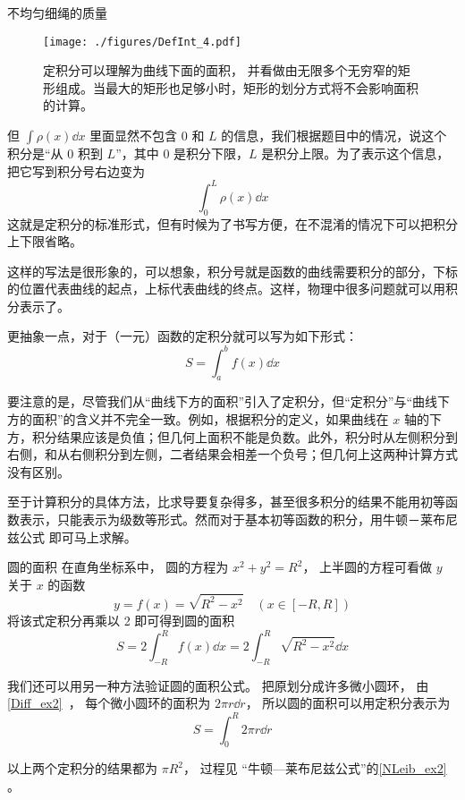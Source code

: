 \begin{example}{不均匀细绳的质量}
\begin{figure}[ht]
\centering
\texttt{[image: ./figures/DefInt\_4.pdf]}
\caption{定积分可以理解为曲线下面的面积， 并看做由无限多个无穷窄的矩形组成。当最大的矩形也足够小时，矩形的划分方式将不会影响面积的计算。} \label{DefInt_fig4}
\end{figure}

但 $\int \rho(x) \dd{x}$ 里面显然不包含 $0$ 和 $L$ 的信息，我们根据题目中的情况，说这个积分是“从 $0$ 积到 $L$”，其中 $0$ 是积分下限，$L$ 是积分上限。为了表示这个信息，把它写到积分号右边变为
\begin{equation}
\int_0^L \rho(x) \dd{x}
\end{equation}
这就是定积分的标准形式，但有时候为了书写方便，在不混淆的情况下可以把积分上下限省略。
\end{example}

这样的写法是很形象的，可以想象，积分号就是函数的曲线需要积分的部分，下标的位置代表曲线的起点，上标代表曲线的终点。这样，物理中很多问题就可以用积分表示了。

更抽象一点，对于（一元）函数的定积分就可以写为如下形式：
\begin{equation}
S=\int^b_a f(x) \dd x
\end{equation}

要注意的是，尽管我们从“曲线下方的面积”引入了定积分，但“定积分”与“曲线下方的面积”的含义并不完全一致。例如，根据积分的定义，如果曲线在 $x$ 轴的下方，积分结果应该是负值；但几何上面积不能是负数。此外，积分时从左侧积分到右侧，和从右侧积分到左侧，二者结果会相差一个负号；但几何上这两种计算方式没有区别。

至于计算积分的具体方法，比求导要复杂得多，甚至很多积分的结果不能用初等函数表示，只能表示为级数等形式。然而对于基本初等函数的积分，用牛顿－莱布尼兹公式 即可马上求解。

\begin{example}{圆的面积}\label{DefInt_ex2}
在直角坐标系中， 圆的方程为 $x^2 + y^2 = R^2$， 上半圆的方程可看做 $y$ 关于 $x$ 的函数
\begin{equation}
y = f(x) = \sqrt{R^2 - x^2} \quad (x\in [-R,R])
\end{equation}
将该式定积分再乘以 2 即可得到圆的面积
\begin{equation}
S = 2\int_{-R}^{R} f(x) \dd{x} = 2\int_{-R}^{R} \sqrt{R^2 - x^2} \dd{x}
\end{equation}

我们还可以用另一种方法验证圆的面积公式。 把原划分成许多微小圆环， 由\autoref{Diff_ex2}~， 每个微小圆环的面积为 $2\pi r\dd{r}$， 所以圆的面积可以用定积分表示为
\begin{equation}
S = \int_0^{R} 2\pi r\dd{r}
\end{equation}

以上两个定积分的结果都为 $\pi R^2$， 过程见 “牛顿—莱布尼兹公式”的\autoref{NLeib_ex2} 。
\end{example}

